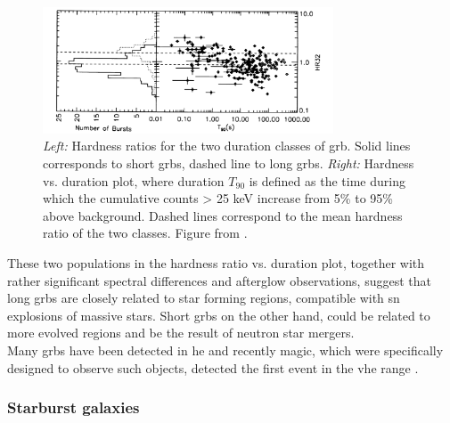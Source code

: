 \documentclass[main.tex]{subfiles}
\begin{document}
\begin{figure}
\centering
 \includegraphics[width=0.77\textwidth]{Pictures/GRBhardnessdurationplot.pdf}
  \caption{\textit{Left:} Hardness ratios for the two duration classes of \gls{grb}. Solid lines corresponds to short \glspl{grb}, dashed line to long \glspl{grb}. \textit{Right:} Hardness vs. duration plot, where duration $T_{90}$ is defined as the time during which the cumulative counts > 25 keV increase from 5\% to 95\% above background. Dashed lines correspond to the mean hardness ratio of the two classes. Figure from \cite{1993GRB2pop}.}
    \label{fig:GRB2classes}
\end{figure}

These two populations in the hardness ratio vs. duration plot, together with rather significant spectral differences \cite{2015GRBorigin} and afterglow observations, suggest that long \glspl{grb} are closely related to star forming regions, compatible with \gls{sn} explosions of massive stars. Short \glspl{grb} on the other hand, could be related to more evolved regions and be the result of neutron star mergers.\\
Many \glspl{grb} have been detected in \gls{he} and recently \gls{magic}, which were specifically designed to observe such objects, detected the first event in the \gls{vhe} range \cite{2019MAGICGRB}.

\subsubsection{Starburst galaxies}
\end{document}
